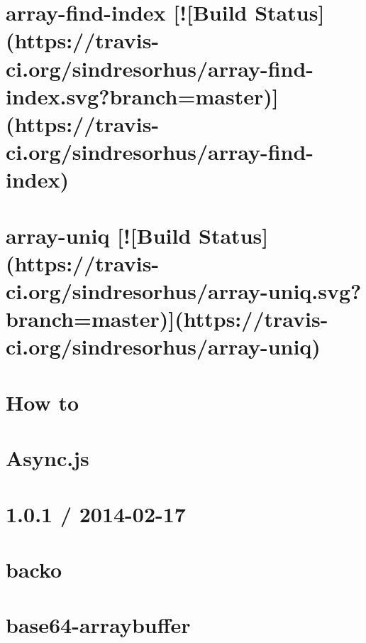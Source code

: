 \documentclass[twoside]{book}
\newcommand{\+}{\discretionary{\mbox{\scriptsize$\hookleftarrow$}}{}{}}
\begin{document}
\chapter{array-\/find-\/index \mbox{[}!\mbox{[}Build Status\mbox{]}(https\+://travis-\/ci.org/sindresorhus/array-\/find-\/index.svg?branch=master)\mbox{]}(https\+://travis-\/ci.org/sindresorhus/array-\/find-\/index)}
\label{md_app_web_node_modules_array-find-index_readme}

\chapter{array-\/uniq \mbox{[}!\mbox{[}Build Status\mbox{]}(https\+://travis-\/ci.org/sindresorhus/array-\/uniq.svg?branch=master)\mbox{]}(https\+://travis-\/ci.org/sindresorhus/array-\/uniq)}
\label{md_app_web_node_modules_array-uniq_readme}

\chapter{How to}
\label{md_app_web_node_modules_arraybuffer_8slice__r_e_a_d_m_e}

\chapter{Async.\+js}
\label{md_app_web_node_modules_async__r_e_a_d_m_e}

\chapter{1.0.1 / 2014-\/02-\/17}
\label{md_app_web_node_modules_backo2__history}

\chapter{backo}
\label{md_app_web_node_modules_backo2__readme}

\chapter{base64-\/arraybuffer}
\label{md_app_web_node_modules_base64-arraybuffer__r_e_a_d_m_e}

\end{document}
